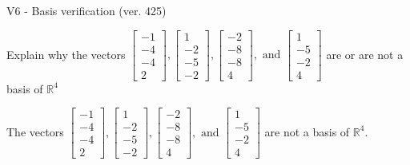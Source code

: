 \begin{exercise}
  \begin{exerciseTitle}V6 - Basis verification (ver. 425)\end{exerciseTitle}
  \begin{exerciseStatement}
    Explain why the vectors \(\left[\begin{array}{r}
-1 \\
-4 \\
-4 \\
2
\end{array}\right] , \left[\begin{array}{r}
1 \\
-2 \\
-5 \\
-2
\end{array}\right] , \left[\begin{array}{r}
-2 \\
-8 \\
-8 \\
4
\end{array}\right] , \text{ and } \left[\begin{array}{r}
1 \\
-5 \\
-2 \\
4
\end{array}\right]\) are or are not a basis of \(\mathbb{R}^4\)	


  \end{exerciseStatement}
  \begin{exerciseAnswer}
   The vectors \(\left[\begin{array}{r}
-1 \\
-4 \\
-4 \\
2
\end{array}\right] , \left[\begin{array}{r}
1 \\
-2 \\
-5 \\
-2
\end{array}\right] , \left[\begin{array}{r}
-2 \\
-8 \\
-8 \\
4
\end{array}\right] , \text{ and } \left[\begin{array}{r}
1 \\
-5 \\
-2 \\
4
\end{array}\right]\) 
  	 are not  a basis of \(\mathbb{R}^4\).
  


  \end{exerciseAnswer}
\end{exercise}